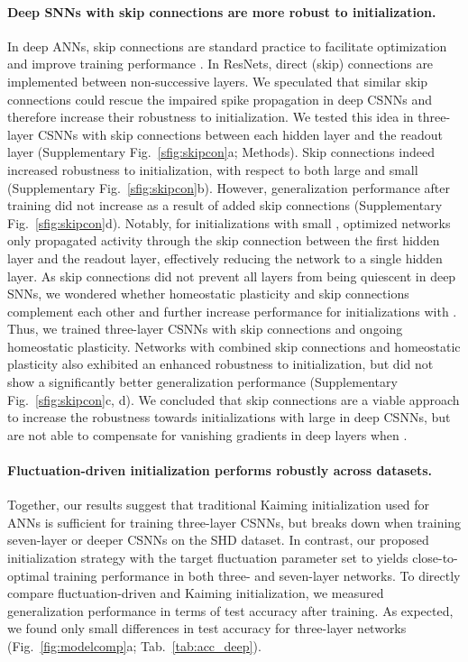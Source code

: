 \documentclass[11pt,a4paper]{article}
\begin{document}
\paragraph{Deep \acp{SNN} with skip connections are more robust to initialization.}
In deep \acp{ANN}, skip connections are standard practice to facilitate optimization and improve training performance \mbox{\citep{Srivastava2015-yw, Srivastava2015-xy, He2016-mi}}. 
In \acp{ResNet}, direct (skip) connections are implemented between non-successive layers.
We speculated that similar skip connections could rescue the impaired spike propagation in deep \acp{CSNN} and therefore increase their robustness to initialization.
We tested this idea in three-layer \acp{CSNN} with skip connections between each hidden layer and the readout layer (Supplementary Fig.~\ref{sfig:skipcon}a; Methods). 
Skip connections indeed increased robustness to initialization, with respect to both large  and small  (Supplementary Fig.~\ref{sfig:skipcon}b).
However, generalization performance after training did not increase as a result of added skip connections (Supplementary Fig.~\ref{sfig:skipcon}d). 
Notably, for initializations with small , optimized networks only propagated activity through the skip connection between the first hidden layer and the readout layer, effectively reducing the network to a single hidden layer.
As skip connections did not prevent all layers from being quiescent in deep \acp{SNN}, we wondered whether homeostatic plasticity and skip connections complement each other and further increase performance for initializations with . 
Thus, we trained three-layer \acp{CSNN} with skip connections and ongoing homeostatic plasticity.  
Networks with combined skip connections and homeostatic plasticity also exhibited an enhanced robustness to initialization, but did not show a significantly better generalization performance (Supplementary Fig.~\ref{sfig:skipcon}c, d). 
We concluded that skip connections are a viable approach to increase the robustness towards initializations with large  in deep \acp{CSNN}, but are not able to compensate for vanishing gradients in deep layers when . 

\paragraph{Fluctuation-driven initialization performs robustly across datasets.}
Together, our results suggest that traditional Kaiming initialization used for \acp{ANN} is sufficient for training three-layer \acp{CSNN}, but breaks down when training seven-layer or deeper \acp{CSNN} on the SHD dataset.
In contrast, our proposed initialization strategy with the target fluctuation parameter set to  yields close-to-optimal training performance in both three- and seven-layer networks.
To directly compare fluctuation-driven and Kaiming initialization, we measured generalization performance in terms of test accuracy after training. 
As expected, we found only small differences in test accuracy for three-layer networks (Fig.~\ref{fig:modelcomp}a; Tab.~\ref{tab:acc_deep}).
\end{document}
